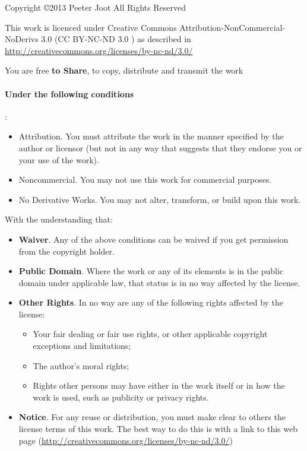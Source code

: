 Copyright \copyright 2013 Peeter Joot
All Rights Reserved

This work is licenced under Creative Commons Attribution-NonCommercial-NoDerivs 3.0 (CC BY-NC-ND 3.0 \ccbyncnd) as described in \href{http://creativecommons.org/licenses/by-nc-nd/3.0/}{http://creativecommons.org/licenses/by-nc-nd/3.0/}

You are free \textbf{to Share}, to copy, distribute and transmit the work

\paragraph{Under the following conditions}:

\begin{itemize}
\item \ccAttribution Attribution.  You must attribute the work in the manner specified by the author or licensor (but not in any way that suggests that they endorse you or your use of the work).
\item \ccNonCommercial Noncommercial. You may not use this work for commercial purposes.
\item \ccNoDerivatives No Derivative Works. You may not alter, transform, or build upon this work.
\end{itemize}

With the understanding that:

\begin{itemize}
\item \textbf{Waiver}. Any of the above conditions can be waived if you get permission from the copyright holder.
\item \textbf{Public Domain}. Where the work or any of its elements is in the public domain under applicable law, that status is in no way affected by the license.
\item \textbf{Other Rights}. In no way are any of the following rights affected by the license:

\begin{itemize}
\item Your fair dealing or fair use rights, or other applicable copyright exceptions and limitations;
\item The author's moral rights;
\item Rights other persons may have either in the work itself or in how the work is used, such as publicity or privacy rights.
\end{itemize}

\item \textbf{Notice}. For any reuse or distribution, you must make clear to others the license terms of this work. The best way to do this is with a link to this web page (\href{http://creativecommons.org/licenses/by-nc-nd/3.0/}{http://creativecommons.org/licenses/by-nc-nd/3.0/})
\end{itemize}
